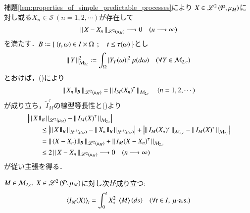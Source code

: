 	\begin{prf}
		補題\ref{lem:properties_of_simple_predictable_processes}により
		$X \in \mathscr{L}^{2} \left(\mathcal{P},\mu_M\right)$に対し或る$X_n \in \mathcal{S}\ (n=1,2,\cdots)$が存在して
		\begin{align}
			\left\|\, X - X_n\, \right\|_{\mathscr{L}^{2} \left(\mu_M\right)} \longrightarrow 0
			\quad (n \longrightarrow \infty)
			\label{eq:thm_stopped_Ito_integral}
		\end{align}
		を満たす．$B \coloneqq \left\{\ (t,\omega) \in I \times \Omega\ \, ; \quad t \leq \tau(\omega)\ \right\}$とし
		\begin{align}
			\left\|\, Y\, \right\|_{\mathcal{M}_{2,c}}^2 \coloneqq \int_\Omega |Y_T(\omega)|^2\ \mu(d\omega)
			\quad (\forall Y \in \mathcal{M}_{2,c})
		\end{align}
		とおけば，()により
		\begin{align}
			\left\|\, X_n \mbox{1}\hspace{-0.25em}\mbox{l}_B\, \right\|_{\mathscr{L}^{2} \left(\mu_M\right)} 
			= \left\|\, I_M(X_n)^\tau\, \right\|_{\mathcal{M}_{2,c}}
			\quad (n=1,2,\cdots)
		\end{align}
		が成り立ち，$\tilde{I}^\tau_M$の線型等長性と()より
		\begin{align}
			&\left| \left\|\, X \mbox{1}\hspace{-0.25em}\mbox{l}_B\, \right\|_{\mathscr{L}^{2} \left(\mu_M\right)} - \left\|\, I_M(X)^\tau\, \right\|_{\mathcal{M}_{2,c}} \right| \\
			&\qquad \leq \left| \left\|\, X \mbox{1}\hspace{-0.25em}\mbox{l}_B\, \right\|_{\mathscr{L}^{2} \left(\mu_M\right)} - \left\|\, X_n \mbox{1}\hspace{-0.25em}\mbox{l}_B\, \right\|_{\mathscr{L}^{2} \left(\mu_M\right)} \right| 
				+ \left| \left\|\, I_M(X_n)^\tau\, \right\|_{\mathcal{M}_{2,c}} - \left\|\, I_M(X)^\tau\, \right\|_{\mathcal{M}_{2,c}} \right| \\
			&\qquad =  \left\|\, (X - X_n) \mbox{1}\hspace{-0.25em}\mbox{l}_B\, \right\|_{\mathscr{L}^{2} \left(\mu_M\right)} 
				+ \left\|\, I_M(X - X_n)^\tau\, \right\|_{\mathcal{M}_{2,c}} \\
			&\qquad \leq 2 \left\|\, X - X_n\, \right\|_{\mathscr{L}^{2} \left(\mu_M\right)} \longrightarrow 0 \quad (n \longrightarrow \infty)
		\end{align}
		が従い主張を得る．
		\QED
	\end{prf}
	
	\begin{screen}
		\begin{prp}[伊藤積分の二次変分]
			$M \in \mathcal{M}_{2,c},\ X \in \mathscr{L}^{2} \left(\mathcal{P},\mu_M\right)$に対し次が成り立つ:
			\begin{align}
				\inprod<I_M(X)>_t = \int_0^t X_s^2\ \inprod<M>(ds)
				\quad (\forall t \in I,\ \mbox{$\mu$-a.s.})
			\end{align}
		\end{prp}
	\end{screen}